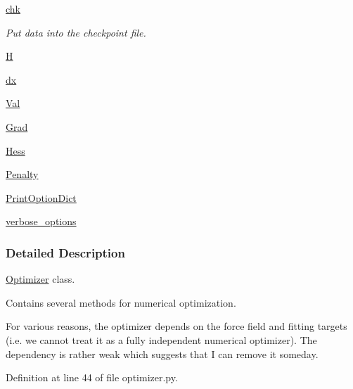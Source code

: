 \begin{DoxyCompactItemize}
\hyperlink{classforcebalance_1_1optimizer_1_1Optimizer_a4b07916dddfdff495a61fd8fb849db3a}{chk}
\begin{DoxyCompactList}\small\item\em \-Put data into the checkpoint file. \end{DoxyCompactList}\item 
\hyperlink{classforcebalance_1_1optimizer_1_1Optimizer_aa082af516e968d41a0e54e5f5901601f}{\-H}
\item 
\hyperlink{classforcebalance_1_1optimizer_1_1Optimizer_af11c90b57a4d7ba5f93e8d2e4cbc69e8}{dx}
\item 
\hyperlink{classforcebalance_1_1optimizer_1_1Optimizer_a145e90c7776604285424a54ed484d651}{\-Val}
\item 
\hyperlink{classforcebalance_1_1optimizer_1_1Optimizer_afda86a3f46feafc0f581f4e6f223ebcf}{\-Grad}
\item 
\hyperlink{classforcebalance_1_1optimizer_1_1Optimizer_ae284871845ef6112dfd915bcb413ef8a}{\-Hess}
\item 
\hyperlink{classforcebalance_1_1optimizer_1_1Optimizer_aaf7fba3e0abb466918f5954160e9cbd4}{\-Penalty}
\item 
\hyperlink{classforcebalance_1_1BaseClass_afc6659278497d7245bc492ecf405ccae}{\-Print\-Option\-Dict}
\item 
\hyperlink{classforcebalance_1_1BaseClass_afd68efa29ccd2f320f4cf82198214aac}{verbose\-\_\-options}
\end{DoxyCompactItemize}


\subsubsection{\-Detailed \-Description}
\hyperlink{classforcebalance_1_1optimizer_1_1Optimizer}{\-Optimizer} class. 

\-Contains several methods for numerical optimization.

\-For various reasons, the optimizer depends on the force field and fitting targets (i.\-e. we cannot treat it as a fully independent numerical optimizer). \-The dependency is rather weak which suggests that \-I can remove it someday. 

\-Definition at line 44 of file optimizer.\-py.



